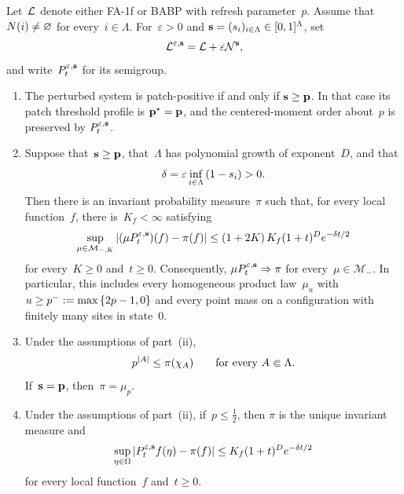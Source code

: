 Let~$\mathcal{L}$ denote either FA-1f or BABP with refresh parameter~$p$. Assume that
$N(i)\neq\varnothing$ for every~$i\in\Lambda$. For~$\varepsilon>0$ and
$\mathbf{s}=(s_i)_{i\in\Lambda}\in[0,1]^\Lambda$, set
\begin{equation*}
\mathcal{L}^{\varepsilon,\mathbf{s}}
=
\mathcal{L}+\varepsilon\mathcal{N}^{\mathbf{s}},
\end{equation*}
and write~$P_t^{\varepsilon,\mathbf{s}}$ for its semigroup.

\begin{proposition}
\label{prop:fa-babp-consequences}
\leavevmode
\begin{enumerate}[label=\textup{(\roman*)}]
\item The perturbed system is patch-positive if and only if
$\mathbf{s}\geq\mathbf{p}$. In that case its patch threshold profile is
$\mathbf{p}^\star=\mathbf{p}$, and the centered-moment order about~$p$ is preserved by
$P_t^{\varepsilon,\mathbf{s}}$.

\item Suppose that~$\mathbf{s}\geq\mathbf{p}$, that~$\Lambda$ has polynomial growth of
exponent~$D$, and that
\begin{equation*}
\delta
=
\varepsilon\inf_{i\in\Lambda}\left(1-s_i\right)
>
0.
\end{equation*}
Then there is an invariant probability measure~$\pi$ such that, for every
local function~$f$, there is~$K_f<\infty$ satisfying
\begin{equation*}
\sup_{\mu\in\mathcal M_{-,K}}
\left|(\mu P_t^{\varepsilon,\mathbf{s}})(f)-\pi(f)\right|
\leq
\left(1+2K\right)K_f(1+t)^D e^{-\delta t/2}
\end{equation*}
for every~$K\geq0$ and~$t\geq0$. Consequently,
$\mu P_t^{\varepsilon,\mathbf{s}}\Rightarrow\pi$ for every~$\mu\in\mathcal M_-$.
In particular, this includes every homogeneous product law~$\mu_u$ with
$u\geq p^-:=\max\left\{2p-1,0\right\}$ and every point mass on a configuration with
finitely many sites in state~$0$.

\item Under the assumptions of part~\textup{(ii)},
\begin{equation*}
p^{\left|A\right|}
\leq
\pi(\chi_A)
\qquad
\text{for every }A\Subset\Lambda.
\end{equation*}
If~$\mathbf{s}=\mathbf{p}$, then~$\pi=\mu_p$.

\item Under the assumptions of part~\textup{(ii)}, if~$p\leq\frac12$, then
$\pi$ is the unique invariant measure and
\begin{equation*}
\sup_{\eta\in\Omega}
\left|P_t^{\varepsilon,\mathbf{s}}f(\eta)-\pi(f)\right|
\leq
K_f(1+t)^D e^{-\delta t/2}
\end{equation*}
for every local function~$f$ and~$t\geq0$.
\end{enumerate}
\end{proposition}

